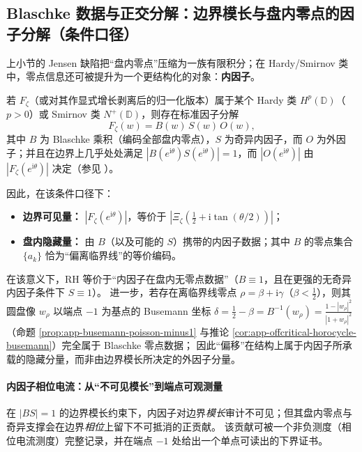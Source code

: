 \subsection{Blaschke 数据与正交分解：边界模长与盘内零点的因子分解（条件口径）}\label{subsec:unit-disk-inner-outer}
上小节的 Jensen 缺陷把“盘内零点”压缩为一族有限积分；在 Hardy/Smirnov 类中，零点信息还可被提升为一个更结构化的对象：\textbf{内因子}。

\begin{remark}
若 \(F_{\zeta}\)（或对其作显式增长剥离后的归一化版本）属于某个 Hardy 类 \(H^p(\mathbb{D})\)（\(p>0\)）或 Smirnov 类 \(N^+(\mathbb{D})\)，则存在标准因子分解
\[
F_{\zeta}(w)=B(w)\,S(w)\,O(w),
\]
其中 \(B\) 为 Blaschke 乘积（编码全部盘内零点），\(S\) 为奇异内因子，而 \(O\) 为外因子；并且在边界上几乎处处满足 \(|B(e^{\mathrm{i}\theta})S(e^{\mathrm{i}\theta})|=1\)，而 \(|O(e^{\mathrm{i}\theta})|\) 由 \(|F_{\zeta}(e^{\mathrm{i}\theta})|\) 决定（参见 \cite{Duren1970TheoryHp,Garnett2007BoundedAnalyticFunctions}）。
\par
因此，在该条件口径下：
\begin{itemize}
  \item \textbf{边界可见量：} \(|F_{\zeta}(e^{\mathrm{i}\theta})|\)，等价于 \(|\Xi_{\zeta}(\tfrac12+\mathrm{i}\tan(\theta/2))|\)；
  \item \textbf{盘内隐藏量：} 由 \(B\)（以及可能的 \(S\)）携带的内因子数据；其中 \(B\) 的零点集合 \(\{a_k\}\) 恰为“偏离临界线”的等价编码。
\end{itemize}
在该意义下，RH 等价于“内因子在盘内无零点数据”（\(B\equiv 1\)，且在更强的无奇异内因子条件下 \(S\equiv 1\)）。
进一步，若存在离临界线零点 \(\rho=\beta+\mathrm{i}\gamma\)（\(\beta<\tfrac12\)），则其圆盘像 \(w_{\rho}\) 以端点 \(-1\) 为基点的 Busemann 坐标
\(
\delta=\tfrac12-\beta
=B^{-1}(w_{\rho})=\frac{1-|w_{\rho}|^{2}}{|1+w_{\rho}|^{2}}
\)
（命题 \ref{prop:app-busemann-poisson-minus1} 与推论 \ref{cor:app-offcritical-horocycle-busemann}）完全属于 Blaschke 零点数据；
因此“偏移”在结构上属于内因子所承载的隐藏分量，而非由边界模长所决定的外因子分量。
\end{remark}

\paragraph{内因子相位电流：从“不可见模长”到端点可观测量}
在 \(|BS|=1\) 的边界模长约束下，内因子对边界\emph{模长}审计不可见；但其盘内零点与奇异支撑会在边界\emph{相位}上留下不可抵消的正贡献。
该贡献可被一个非负测度（相位电流测度）完整记录，并在端点 \(-1\) 处给出一个单点可读出的下界证书。

